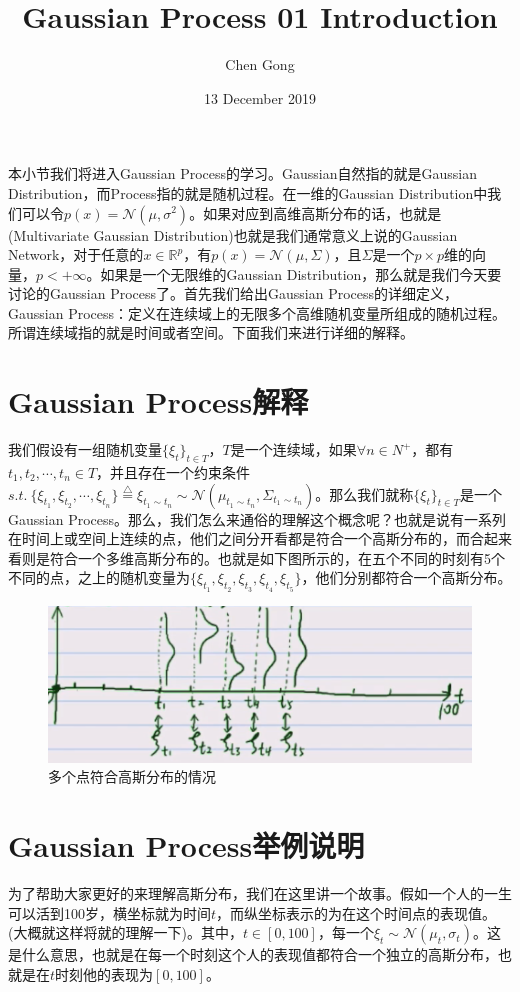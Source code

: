 \documentclass[a4paper]{article}
\title{Gaussian Process 01 Introduction}
\author{Chen Gong}
\date{13 December 2019}
\begin{document}
\maketitle
本小节我们将进入Gaussian Process的学习。Gaussian自然指的就是Gaussian Distribution，而Process指的就是随机过程。在一维的Gaussian Distribution中我们可以令$p(x) = \mathcal{N}(\mu,\sigma^2)$。如果对应到高维高斯分布的话，也就是(Multivariate Gaussian Distribution)也就是我们通常意义上说的Gaussian Network，对于任意的$x\in \mathbb{R}^p$，有$p(x) = \mathcal{N}(\mu,\Sigma)$，且$\Sigma$是一个$p\times p$维的向量，$p< +\infty$。如果是一个无限维的Gaussian Distribution，那么就是我们今天要讨论的Gaussian Process了。首先我们给出Gaussian Process的详细定义，{\color{red}Gaussian Process：定义在连续域上的无限多个高维随机变量所组成的随机过程。 }所谓连续域指的就是时间或者空间。下面我们来进行详细的解释。

\section{Gaussian Process解释}
我们假设有一组随机变量$\{ \xi_t \}_{t\in T}$，$T$是一个连续域，如果$\forall n \in N^+$，都有$t_1,t_2,\cdots,t_n \in T$，并且存在一个约束条件$s.t.\ \{\xi_{t_1},\xi_{t_2},\cdots,\xi_{t_n}\} \stackrel{\triangle}{=} \xi_{t_1\sim t_n} \sim \mathcal{N}(\mu_{t_1\sim t_n},\Sigma_{t_1\sim t_n})$。那么我们就称$\{ \xi_t \}_{t\in T}$是一个Gaussian Process。那么，我们怎么来通俗的理解这个概念呢？也就是说有一系列在时间上或空间上连续的点，他们之间分开看都是符合一个高斯分布的，而合起来看则是符合一个多维高斯分布的。也就是如下图所示的，在五个不同的时刻有5个不同的点，之上的随机变量为$\{\xi_{t_1},\xi_{t_2},\xi_{t_3},\xi_{t_4},\xi_{t_5}\}$，他们分别都符合一个高斯分布。
\begin{figure}[H]
    \centering
    \includegraphics[width=.55\textwidth]{微信图片_20191213121553.png}
    \caption{多个点符合高斯分布的情况}
    \label{fig:my_label_1}
\end{figure}

\section{Gaussian Process举例说明}
为了帮助大家更好的来理解高斯分布，我们在这里讲一个故事。假如一个人的一生可以活到100岁，横坐标就为时间$t$，而纵坐标表示的为在这个时间点的表现值。(大概就这样将就的理解一下)。其中，$t \in [0,100]$，每一个$\xi_t \sim \mathcal{N}(\mu_t,\sigma_t)$。这是什么意思，也就是在每一个时刻这个人的表现值都符合一个独立的高斯分布，也就是在$t$时刻他的表现为$[0,100]$。
\end{document}
